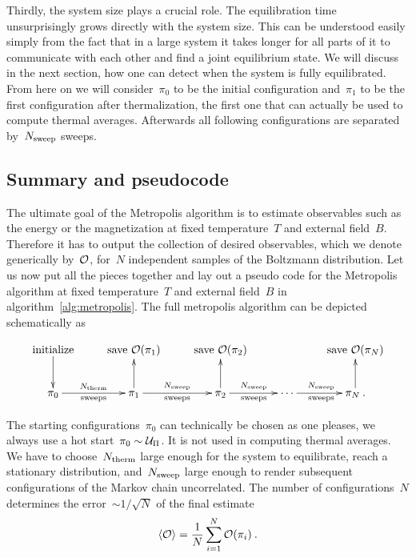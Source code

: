 Thirdly, the system size plays a crucial role. The equilibration time
unsurprisingly grows directly with the system size. This can be understood
easily simply from the fact that in a large system it takes longer for all parts
of it to communicate with each other and find a joint equilibrium state. We will
discuss in the next section, how one can detect when the system is fully
equilibrated. From here on we will consider~$\pi_0$ to be the initial
configuration and~$\pi_1$ to be the first configuration after thermalization,
\ie{} the first one that can actually be used to compute thermal averages.
Afterwards all following configurations are separated by~$N_{\mathrm{sweep}}$ sweeps.

\subsection{Summary and pseudocode}

The ultimate goal of the Metropolis algorithm is to estimate observables such as
the energy or the magnetization at fixed temperature~$T$ and external field~$B$.
Therefore it has to output the collection of desired observables, which we
denote generically by~$\mathcal{O}$, for~$N$ independent samples of the Boltzmann
distribution. Let us now put all the pieces together and lay out a pseudo code
for the Metropolis algorithm at fixed temperature~$T$ and external field~$B$ in
algorithm~\ref{alg:metropolis}. The full metropolis algorithm can be depicted
schematically as

\begin{equation}
  \xymatrix{%
    \text{initialize} \ar[d]
      &\text{save } \cO(\pi_1)
      &\text{save } \cO(\pi_2)
      && \text{save } \cO(\pi_N) \\
    \pi_0 \ar[r]^{\Ntherm}_{\text{sweeps}}
    & \pi_1 \ar[r]^{\Nsweep}_{\text{sweeps}} \ar[u]
    & \pi_2 \ar[r]^{\Nsweep}_{\text{sweeps}} \ar[u]
    & \cdots \ar[r]^{\Nsweep}_{\text{sweeps}}
    & \pi_N \:. \ar[u]
  }
\end{equation}

The starting configurations~$\pi_0$ can technically be chosen as one pleases, we
always use a hot start~$\pi_0 \sim \mathcal{U}_{\Pi}$. It is not used in computing
thermal averages. We have to choose~$N_{\mathrm{therm}}$ large enough for the system to
equilibrate, \ie{} reach a stationary distribution, and~$N_{\mathrm{sweep}}$ large enough
to render subsequent configurations of the Markov chain uncorrelated. The number
of configurations~$N$ determines the error~$\sim 1/\sqrt{N}$ of the final
estimate
%
\begin{equation}
  \langle \mathcal{O} \rangle = \frac{1}{N} \sum_{i=1}^N \mathcal{O}(\pi_i) \:.
\end{equation}

